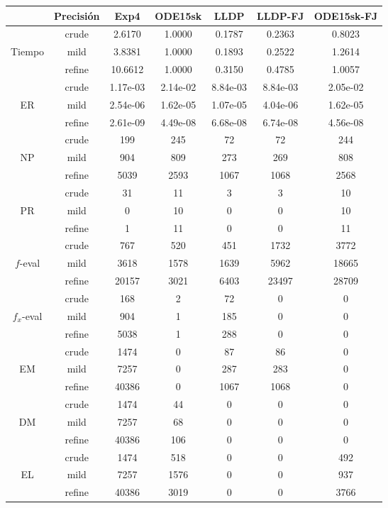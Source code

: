 \begin{table}[htb]
\centering
\begin{tabular}{ |c|c|c|c|c|c|c| }
\hline
 & Precisi\'on & Exp4 & ODE15sk & LLDP & LLDP-FJ & ODE15sk-FJ \\
\hline
  & crude & 2.6170 & 1.0000 & 0.1787 & 0.2363 & 0.8023 \\
 Tiempo  & mild & 3.8381 & 1.0000 & 0.1893 & 0.2522 & 1.2614 \\
  & refine & 10.6612 & 1.0000 & 0.3150 & 0.4785 & 1.0057 \\
\hline
  & crude & 1.17e-03 & 2.14e-02 & 8.84e-03 & 8.84e-03 & 2.05e-02 \\
 ER  & mild & 2.54e-06 & 1.62e-05 & 1.07e-05 & 4.04e-06 & 1.62e-05 \\
  & refine & 2.61e-09 & 4.49e-08 & 6.68e-08 & 6.74e-08 & 4.56e-08 \\
\hline
  & crude & 199 & 245 & 72 & 72 & 244 \\
 NP  & mild & 904 & 809 & 273 & 269 & 808 \\
  & refine & 5039 & 2593 & 1067 & 1068 & 2568 \\
\hline
  & crude & 31 & 11 & 3 & 3 & 10 \\
 PR  & mild & 0 & 10 & 0 & 0 & 10 \\
  & refine & 1 & 11 & 0 & 0 & 11 \\
\hline
  & crude & 767 & 520 & 451 & 1732 & 3772 \\
 $f$-eval  & mild & 3618 & 1578 & 1639 & 5962 & 18665 \\
  & refine & 20157 & 3021 & 6403 & 23497 & 28709 \\
\hline
  & crude & 168 & 2 & 72 & 0 & 0 \\
 $f_x$-eval  & mild & 904 & 1 & 185 & 0 & 0 \\
  & refine & 5038 & 1 & 288 & 0 & 0 \\
\hline
  & crude & 1474 & 0 & 87 & 86 & 0 \\
 EM  & mild & 7257 & 0 & 287 & 283 & 0 \\
  & refine & 40386 & 0 & 1067 & 1068 & 0 \\
\hline
  & crude & 1474 & 44 & 0 & 0 & 0 \\
 DM  & mild & 7257 & 68 & 0 & 0 & 0 \\
  & refine & 40386 & 106 & 0 & 0 & 0 \\
\hline
  & crude & 1474 & 518 & 0 & 0 & 492 \\
 EL  & mild & 7257 & 1576 & 0 & 0 & 937 \\
  & refine & 40386 & 3019 & 0 & 0 & 3766 \\

\end{tabular}
\end{table}
